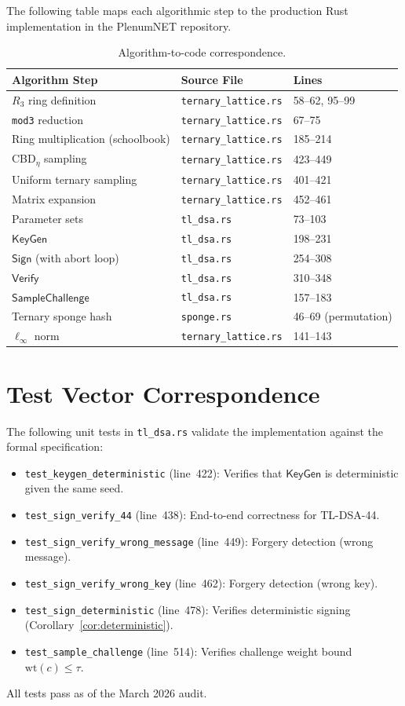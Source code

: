 \documentclass[11pt,a4paper]{article}
\theoremstyle{definition}
\newcommand{\wt}{\mathrm{wt}}
\newcommand{\KeyGen}{\textsf{KeyGen}}
\newcommand{\Sign}{\textsf{Sign}}
\newcommand{\Verify}{\textsf{Verify}}
\begin{document}
The following table maps each algorithmic step to the production Rust implementation in the PlenumNET repository.

\begin{table}[ht]
\centering
\small
\caption{Algorithm-to-code correspondence.}
\begin{tabular}{@{}lll@{}}
\toprule
Algorithm Step & Source File & Lines \\
\midrule
$R_3$ ring definition & \texttt{ternary\_lattice.rs} & 58--62, 95--99 \\
\texttt{mod3} reduction & \texttt{ternary\_lattice.rs} & 67--75 \\
Ring multiplication (schoolbook) & \texttt{ternary\_lattice.rs} & 185--214 \\
CBD$_\eta$ sampling & \texttt{ternary\_lattice.rs} & 423--449 \\
Uniform ternary sampling & \texttt{ternary\_lattice.rs} & 401--421 \\
Matrix expansion & \texttt{ternary\_lattice.rs} & 452--461 \\
Parameter sets & \texttt{tl\_dsa.rs} & 73--103 \\
$\KeyGen$ & \texttt{tl\_dsa.rs} & 198--231 \\
$\Sign$ (with abort loop) & \texttt{tl\_dsa.rs} & 254--308 \\
$\Verify$ & \texttt{tl\_dsa.rs} & 310--348 \\
$\textsf{SampleChallenge}$ & \texttt{tl\_dsa.rs} & 157--183 \\
Ternary sponge hash & \texttt{sponge.rs} & 46--69 (permutation) \\
$\ell_\infty$ norm & \texttt{ternary\_lattice.rs} & 141--143 \\
\bottomrule
\end{tabular}
\end{table}

\section{Test Vector Correspondence}
\label{app:tests}

The following unit tests in \texttt{tl\_dsa.rs} validate the implementation against the formal specification:

\begin{itemize}[leftmargin=2em]
\item \texttt{test\_keygen\_deterministic} (line~422): Verifies that $\KeyGen$ is deterministic given the same seed.
\item \texttt{test\_sign\_verify\_44} (line~438): End-to-end correctness for TL-DSA-44.
\item \texttt{test\_sign\_verify\_wrong\_message} (line~449): Forgery detection (wrong message).
\item \texttt{test\_sign\_verify\_wrong\_key} (line~462): Forgery detection (wrong key).
\item \texttt{test\_sign\_deterministic} (line~478): Verifies deterministic signing (Corollary~\ref{cor:deterministic}).
\item \texttt{test\_sample\_challenge} (line~514): Verifies challenge weight bound $\wt(c) \leq \tau$.
\end{itemize}

All tests pass as of the March 2026 audit.
\end{document}
